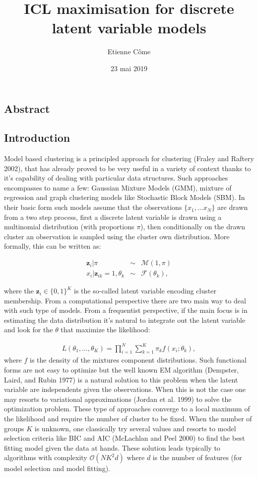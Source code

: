 \documentclass[]{article}
\title{ICL maximisation for discrete latent variable models}
\author{Etienne Côme}
\date{23 mai 2019}
\begin{document}
\maketitle

\subsection{Abstract}\label{abstract}

\subsection{Introduction}\label{introduction}

Model based clustering is a principled approach for clustering (Fraley
and Raftery 2002), that has already proved to be very useful in a
variety of context thanks to it's capability of dealing with particular
data structures. Such approaches encompasses to name a few: Gaussian
Mixture Models (GMM), mixture of regression and graph clustering models
like Stochastic Block Models (SBM). In their basic form such models
assume that the observations \(\{x_1,...x_N\}\) are drawn from a two
step process, first a discrete latent variable is drawn using a
multinomial distribution (with proportions \(\pi\)), then conditionally
on the drawn cluster an observation is sampled using the cluster own
distribution. More formally, this can be written as:

\[
\begin{eqnarray}
\mathbf{z}_i|\pi&\sim& \mathcal{M}(1,\pi)\\
x_i|\mathbf{z}_{ik}=1,\theta_{k}&\sim& \mathcal{F}(\theta_{k}),
\end{eqnarray}
\]

where the \(\mathbf{z}_i\in\{0,1\}^K\) is the so-called latent variable
encoding cluster membership. From a computational perspective there are
two main way to deal with such type of models. From a frequentist
perspective, if the main focus is in estimating the data distribution
it's natural to integrate out the latent variable and look for the
\(\theta\) that maximize the likelihood:

\[
\begin{eqnarray}
L(\theta_1,...,\theta_K)=\prod_{i=1}^N\sum_{k=1}^{K}\pi_k f(x_i;\theta_k),
\end{eqnarray}
\] where \(f\) is the density of the mixtures component distributions.
Such functional forms are not easy to optimize but the well known EM
algorithm (Dempster, Laird, and Rubin 1977) is a natural solution to
this problem when the latent variable are independents given the
observations. When this is not the case one may resorts to variational
approximations (Jordan et al. 1999) to solve the optimization problem.
These type of approaches converge to a local maximum of the likelihood
and require the number of cluster to be fixed. When the number of groups
\(K\) is unknown, one classically try several values and resorts to
model selection criteria like BIC and AIC (McLachlan and Peel 2000) to
find the best fitting model given the data at hands. These solution
leads typically to algorithms with complexity \(\mathcal{O}(NK^2d)\)
where \(d\) is the number of features (for model selection and model
fitting).
\end{document}
